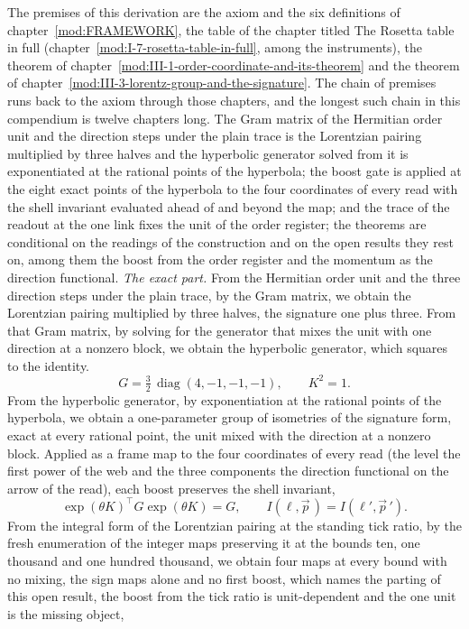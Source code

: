 \begin{chproof}
The premises of this derivation are the axiom and the six definitions of chapter~\ref{mod:FRAMEWORK}, the table of the chapter titled The Rosetta table in full (chapter~\ref{mod:I-7-rosetta-table-in-full}, among the instruments), the theorem of chapter~\ref{mod:III-1-order-coordinate-and-its-theorem} and the theorem of chapter~\ref{mod:III-3-lorentz-group-and-the-signature}. The chain of premises runs back to the axiom through those chapters, and the longest such chain in this compendium is twelve chapters long.
The Gram matrix of the Hermitian order unit and the direction steps under the plain trace is the Lorentzian pairing multiplied by three halves and the hyperbolic generator solved from it is exponentiated at the rational points of the hyperbola; the boost gate is applied at the eight exact points of the hyperbola to the four coordinates of every read with the shell invariant evaluated ahead of and beyond the map; and the trace of the readout at the one link fixes the unit of the order register; the theorems are conditional on the readings of the construction and on the open results they rest on, among them the boost from the order register and the momentum as the direction functional.
\textit{The exact part.}
From the Hermitian order unit and the three direction steps under the plain trace, by the Gram matrix, we obtain the Lorentzian pairing multiplied by three halves, the signature one plus three. From that Gram matrix, by solving for the generator that mixes the unit with one direction at a nonzero block, we obtain the hyperbolic generator, which squares to the identity.
\begin{equation}
G = \tfrac{3}{2}\,\operatorname{diag}(4, -1, -1, -1), \qquad K^{2} = 1 .
\end{equation}
From the hyperbolic generator, by exponentiation at the rational points of the hyperbola, we obtain a one-parameter group of isometries of the signature form, exact at every rational point, the unit mixed with the direction at a nonzero block. Applied as a frame map to the four coordinates of every read (the level the first power of the web and the three components the direction functional on the arrow of the read), each boost preserves the shell invariant,
\begin{equation}
\exp(\theta K)^{\top} G \exp(\theta K) = G, \qquad I(\ell, \vec{p}\,) = I(\ell', \vec{p}\,') .
\end{equation}
From the integral form of the Lorentzian pairing at the standing tick ratio, by the fresh enumeration of the integer maps preserving it at the bounds ten, one thousand and one hundred thousand, we obtain four maps at every bound with no mixing, the sign maps alone and no first boost, which names the parting of this open result, the boost from the tick ratio is unit-dependent and the one unit is the missing object,

\end{chproof}
